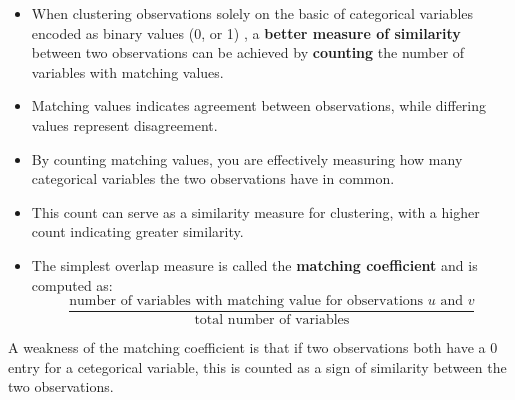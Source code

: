 \documentclass{report}
\begin{document}
\begin{itemize}
  \item When clustering observations solely on the basic of categorical variables encoded as binary values (0, or 1) , a \textbf{better measure of similarity} between two observations can be achieved by \textbf{counting} the number of variables with matching values.
  \item Matching values indicates agreement between observations, while differing values represent disagreement.
  \item By counting matching values, you are effectively measuring how many categorical variables the two observations have in common.
  \item This count can serve as a similarity measure for clustering, with a higher count indicating greater similarity.
  \item The simplest overlap measure is called the \textbf{matching coefficient} and is computed as:
    $$ \frac{\text{number of variables with matching value for observations $u$ and $v$}}{\text{total number of variables}}$$
\end{itemize}
A weakness of the matching coefficient is that if two observations both have a 0 entry for a cetegorical variable, this is counted as a sign of similarity between the two observations.
\vspace{2mm}
\end{document}
